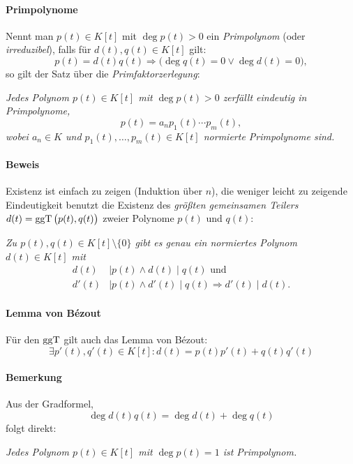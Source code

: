 \paragraph{Primpolynome}
\begin{Definition}[Primpolynom]
	Nennt man $ p(t)\in K[t] $ mit $ \deg p(t) > 0$ ein \emph{Primpolynom} (oder \emph{irreduzibel}), falls für $ d(t),q(t)\in K[t] $ gilt:
		\[ p(t)= d(t)q(t) \Rightarrow \Big( \deg q(t)=0 \lor \deg d(t) = 0 \Big), \]
	so gilt der Satz über die \emph{Primfaktorzerlegung}:
\end{Definition}
	\begin{Satz}[Primfaktorzerlegung]
	\begin{addmargin}{1cm}
		\textit{Jedes Polynom $ p(t)\in K[t] $ mit $ \deg p(t)>0 $ zerfällt eindeutig in Primpolynome,
			\[ p(t) = a_n p_1(t) \cdots p_m(t), \]
		wobei $ a_n\in K $ und $ p_1(t),\dots,p_m(t)\in K[t] $ normierte Primpolynome sind.}
	\end{addmargin}
	\end{Satz}
	
\paragraph{Beweis}	
	Existenz ist einfach zu zeigen (Induktion über $ n $), die weniger leicht zu zeigende Eindeutigkeit benutzt die Existenz des \emph{größten gemeinsamen Teilers} $ d(t) = \operatorname{ggT}\big(p(t),q(t)\big) $ zweier Polynome $ p(t) $ und $ q(t) $:

	\begin{addmargin}{1cm}
		\textit{Zu $ p(t),q(t) \in K[t]\setminus \{0\} $ gibt es genau ein normiertes Polynom $ d(t)\in K[t] $ mit
			\begin{align*}
				d(t)&\mid p(t)\land d(t)\mid q(t) \text{ und}\\
				d'(t)&\mid p(t)\land d'(t)\mid q(t) \Rightarrow d'(t)\mid d(t).
			\end{align*}}
	\end{addmargin}
\paragraph{Lemma von B\'ezout}
	\label{Bezout}
	\begin{Lemma}
	Für den $ \operatorname{ggT} $ gilt auch das Lemma von B\'ezout:
		\[ \exists p'(t),q'(t)\in K[t]: d(t)=p(t)p'(t)+q(t)q'(t) \]
	\end{Lemma}
\paragraph{Bemerkung}
	Aus der Gradformel,
		\[ \deg d(t)q(t) = \deg d(t)+\deg q(t) \]
	folgt direkt:
		\begin{addmargin}{1cm}
			\textit{Jedes Polynom $ p(t)\in K[t] $ mit $ \deg p(t)=1 $ ist Primpolynom.}
		\end{addmargin}

